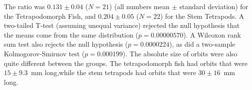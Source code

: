 The ratio was $0.131 \pm 0.04$  ($N=21$) (all numbers mean $\pm$ standard deviation) for the Tetrapodomorph Fish, and $0.204 \pm  0.05$ ($N=22$) for the Stem Tetrapods. A two-tailed  T-test (assuming unequal variance) rejected the null hypothesis that the means come from the same distribution ($p = 0.00000570$). A Wilcoxon rank sum test also rejects the null hypothesis ($p = 0.0000224$), as did a two-sample Kolmogorov-Smirnov test ($p = 0.000199$).  The absolute size of orbits were also quite different between the groups. The tetrapodomorph fish had orbits that were $15 \pm 9.3$~mm long,while the stem tetrapods had orbits that were $30 \pm 16$~mm long.